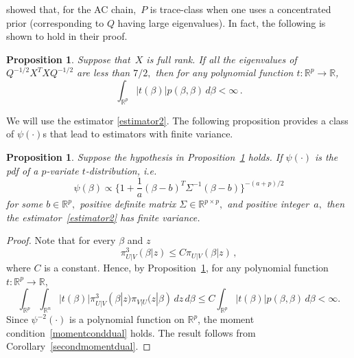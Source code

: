 \documentclass[11pt]{article}
\newtheorem{proposition}[theorem]{Proposition}
\begin{document}
        \citet{chakraborty2016convergence}
        showed that, for the AC chain,~$P$ is trace-class when one uses a concentrated
        prior (corresponding to $Q$ having large eigenvalues). In
        fact, the following is shown to hold in their proof.
	\begin{proposition} \label{probittrace} Suppose that~$X$ is full
          rank. If all the eigenvalues of $Q^{-1/2}X^TXQ^{-1/2}$ are less
          than $7/2,$ then for any polynomial function $t:
          \mathbb{R}^p \to \mathbb{R}$,
		\[
		\int_{\mathbb{R}^p} |t(\beta)| p(\beta,\beta) \,
                d\beta < \infty \,.
		\]
	\end{proposition}
	We will use the estimator \eqref{estimator2}.  The following
        proposition provides a class of $\psi(\cdot)$s that lead to
        estimators with finite variance.
	\begin{proposition} \label{probitpsi} Suppose the hypothesis
          in Proposition~\ref{probittrace} holds. If $\psi(\cdot)$ is
          the pdf of a $p$-variate $t$-distribution, i.e.
		\[
		\psi(\beta) \propto \bigg\{ 1 + \frac{1}{a}(\beta - b)^T \Sigma^{-1}  (\beta - b) \bigg\}^{-(a+p)/2}
		\]
		for some $b \in \mathbb{R}^p,$ positive definite
                matrix $\Sigma \in \mathbb{R}^{p \times p},$ and
                positive integer~$a,$ then the
                estimator~\eqref{estimator2} has finite variance.
	\end{proposition}
	\begin{proof}
          Note that for every $\beta$ and $z$
		\[
		\pi^3_{U|V} (\beta|z) \leq C \pi_{U|V} (\beta|z) \,,
		\]
		where $C$ is a constant. Hence, by Proposition~\ref{probittrace}, for any polynomial
                function $t: \mathbb{R}^p \to \mathbb{R},$
		\[
		\int_{\mathbb{R}^p} \int_{\mathbb{R}^n} |t(\beta)|
                \pi^3_{U|V} (\beta|z) \pi_{V|U} (z|\beta) \,
                dz\,d\beta \leq C\int_{\mathbb{R}^p} |t(\beta)|
                p(\beta,\beta) \, d\beta < \infty.
		\]
		Since $\psi^{-2}(\cdot)$ is a polynomial function on
                $\mathbb{R}^p$, the moment
                condition~\eqref{momentconddual} holds. The result
                follows from Corollary~\ref{secondmomentdual}.
	\end{proof}
	
\end{document}
